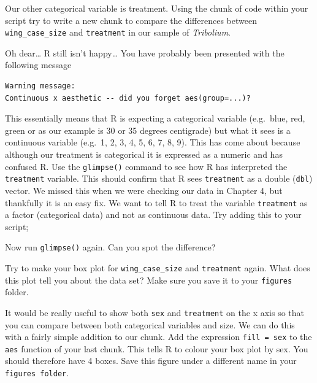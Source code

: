 \documentclass[
]{book}
\newenvironment{Shaded}{\begin{snugshade}}{\end{snugshade}}
\newcommand{\CommentTok}[1]{\textcolor[rgb]{0.56,0.35,0.01}{\textit{#1}}}
\newcommand{\FunctionTok}[1]{\textcolor[rgb]{0.00,0.00,0.00}{#1}}
\newcommand{\NormalTok}[1]{#1}
\newcommand{\OtherTok}[1]{\textcolor[rgb]{0.56,0.35,0.01}{#1}}
\newcommand{\SpecialCharTok}[1]{\textcolor[rgb]{0.00,0.00,0.00}{#1}}
\begin{document}
Our other categorical variable is treatment. Using the chunk of code within your script try to write a new chunk to compare the differences between \texttt{wing\_case\_size} and \texttt{treatment} in our sample of \emph{Tribolium}.

Oh dear\ldots{} R still isn't happy\ldots{} You have probably been presented with the following message

\begin{verbatim}
Warning message:
Continuous x aesthetic -- did you forget aes(group=...)? 
\end{verbatim}

This essentially means that R is expecting a categorical variable (e.g.~blue, red, green or as our example is 30 or 35 degrees centigrade) but what it sees is a continuous variable (e.g.~1, 2, 3, 4, 5, 6, 7, 8, 9). This has come about because although our treatment is categorical it is expressed as a numeric and has confused R. Use the \texttt{glimpse()} command to see how R has interpreted the \texttt{treatment} variable. This should confirm that R sees \texttt{treatment} as a double (\texttt{dbl}) vector. We missed this when we were checking our data in Chapter 4, but thankfully it is an easy fix. We want to tell R to treat the variable \texttt{treatment} as a factor (categorical data) and not as continuous data. Try adding this to your script;

\begin{Shaded}
\end{Shaded}

Now run \texttt{glimpse()} again. Can you spot the difference?

Try to make your box plot for \texttt{wing\_case\_size} and \texttt{treatment} again. What does this plot tell you about the data set? Make sure you save it to your \texttt{figures} folder.

It would be really useful to show both \texttt{sex} and \texttt{treatment} on the x axis so that you can compare between both categorical variables and size. We can do this with a fairly simple addition to our chunk. Add the expression \texttt{fill\ =\ sex} to the \texttt{aes} function of your last chunk. This tells R to colour your box plot by sex. You should therefore have 4 boxes. Save this figure under a different name in your \texttt{figures\ folder}.
\end{document}
